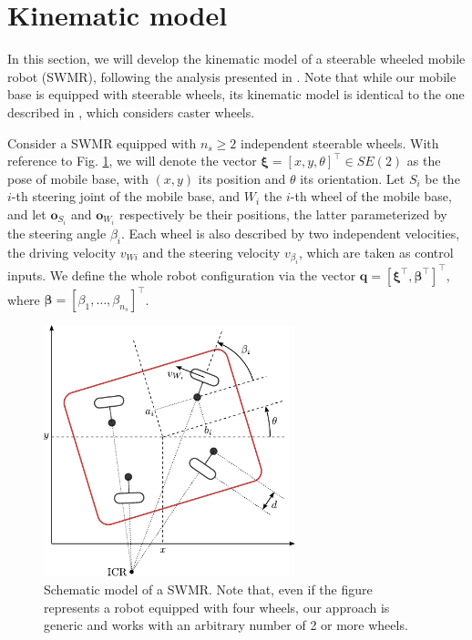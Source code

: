 \section{Kinematic model}
\label{sec:kinematic-model}
In this section, we will develop the kinematic model of a steerable wheeled
mobile robot (SWMR), following the analysis presented in
\cite{RobuffoGiordano2009ICRA}. Note that while our mobile base is equipped
with steerable wheels, its kinematic model is identical to the one described
in \cite{RobuffoGiordano2009ICRA}, which considers caster wheels.

Consider a SWMR equipped with $n_s \ge 2$ independent steerable wheels.
With reference to Fig. \ref{fig:swmr}, we will denote the vector
$\bm{\xi} = [x, y, \theta]^\top \in SE(2)$ as the pose of mobile base,
with $(x, y)$ its position and $\theta$ its orientation. Let $S_i$ be
the $i$-th steering joint of the mobile base, and $W_i$ the $i$-th wheel of
the mobile base, and let $\bm{o}_{S_i}$ and $\bm{o}_{W_i}$ respectively be
their positions, the latter parameterized by the steering angle $\beta_i$.
Each wheel is also described by two independent velocities, the driving
velocity $v_{Wi}$ and the steering velocity $v_{\beta_i}$, which are taken
as control inputs. We define the whole robot configuration via the vector
$\bm{q}=[\bm{\xi}^\top, \bm{\beta}^\top]^\top$, where
$\bm{\beta}=[\beta_1, \dots, \beta_{n_s}]^\top$.

\begin{figure}
    \centering
    \includegraphics[width=0.65\textwidth]{figures/SWMR/swmr.pdf}
    \caption{Schematic model of a SWMR. Note that, even if the figure
        represents a robot equipped with four wheels, our approach is generic
        and works with an arbitrary number of 2 or more wheels.}
    \label{fig:swmr}
\end{figure}

